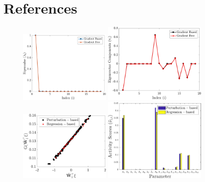 \documentclass[1pt]{elsarticle}
\begin{document}
\section*{References}



\begin{figure}[htbp]
 \begin{center}
  \includegraphics[width=0.40\textwidth]{./Figures/comp_eig}
\hspace{1mm}
  \includegraphics[width=0.45\textwidth]{./Figures/comp_eigv}
  \\ \vspace{5mm}
  \includegraphics[width=0.40\textwidth]{./Figures/comp_ssp}
\hspace{1mm}
  \includegraphics[width=0.45\textwidth]{./Figures/comp_as}

\end{center}
\end{figure}
\end{document}
